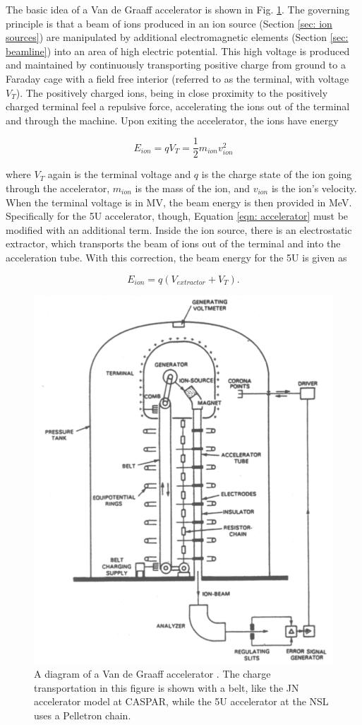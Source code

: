 The basic idea of a Van de Graaff accelerator is shown in Fig. \ref{fig: vdg principles}. The governing principle is that a beam of ions produced in an ion source (Section \ref{sec: ion sources}) are manipulated by additional electromagnetic elements (Section \ref{sec: beamline}) into an area of high electric potential. This high voltage is produced and maintained by continuously transporting positive charge from ground to a Faraday cage with a field free interior (referred to as the terminal, with voltage $V_{T}$). The positively charged ions, being in close proximity to the positively charged terminal feel a repulsive force, accelerating the ions out of the terminal and through the machine. Upon exiting the accelerator, the ions have energy

\begin{equation}
E_{ion} = qV_{T} = \dfrac{1}{2} m_{ion} v_{ion}^{2}
\label{eqn: accelerator}
\end{equation}

\noindent where $V_{T}$ again is the terminal voltage and $q$ is the charge state of the ion going through the accelerator, $m_{ion}$ is the mass of the ion, and $v_{ion}$ is the ion's velocity. When the terminal voltage is in MV, the beam energy is then provided in MeV. Specifically for the 5U accelerator, though, Equation \ref{eqn: accelerator} must be modified with an additional term. Inside the ion source, there is an electrostatic extractor, which transports the beam of ions out of the terminal and into the acceleration tube. With this correction, the beam energy for the 5U is given as

\begin{equation}
E_{ion} = q(V_{extractor} + V_{T}).
\label{eqn: beam energy}
\end{equation}

\begin{figure}
\centering
\includegraphics[width=0.5\linewidth]{figures/vdgDiagram.png}
\caption{A diagram of a Van de Graaff accelerator \cite{RolfsBook}. The charge transportation in this figure is shown with a belt, like the JN accelerator model at CASPAR, while the 5U accelerator at the NSL uses a Pelletron chain. }
\label{fig: vdg principles}
\end{figure}

